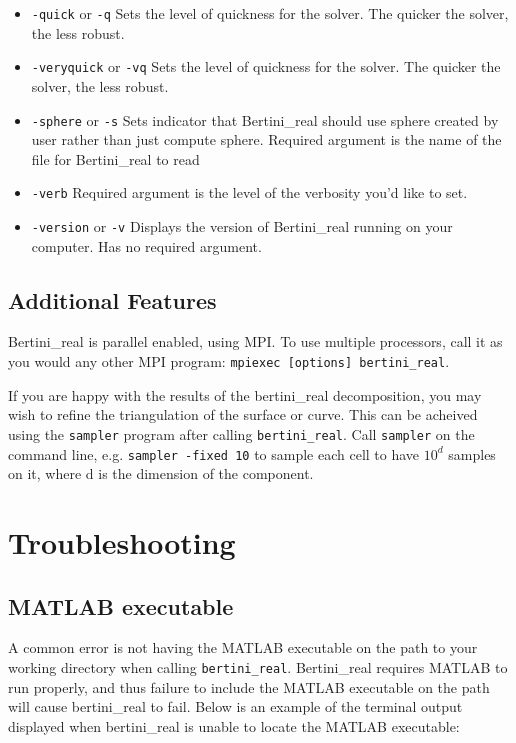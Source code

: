 \documentclass[10pt]{article}
\begin{document}
\begin {itemize}
\item \texttt{-quick} or \texttt{-q} \newline Sets the level of quickness for the solver. The quicker the solver, the less robust. 
\item \texttt{-veryquick} or \texttt{-vq} \newline Sets the level of quickness for the solver. The quicker the solver, the less robust. 
\item \texttt{-sphere} or \texttt{-s} \newline Sets indicator that Bertini\_real should use sphere created by user rather than just compute sphere. Required argument is the name of the file for Bertini\_real to read
\item \texttt{-verb} \newline Required argument is the level of the verbosity you'd like to set.
\item \texttt{-version} or \texttt{-v} \newline Displays the version of Bertini\_real running on your computer. Has no required argument. 
\end{itemize}

\subsection{Additional Features}

Bertini\_real is parallel enabled, using MPI. To use multiple processors, call it as you would any other MPI program: \texttt{mpiexec [options] bertini\_real}. \par
If you are happy with the results of the bertini\_real decomposition, you may wish to refine the triangulation of the surface or curve. This can be acheived using the \texttt{sampler} program after calling \texttt{bertini\_real}. Call \texttt{sampler} on the command line, e.g. \texttt{sampler -fixed 10} to sample each cell to have $10^d$ samples on it, where d is the dimension of the component. 

\section{Troubleshooting}
\subsection{MATLAB executable}
A common error is not having the MATLAB executable on the path to your working directory when calling \texttt{bertini\_real}. Bertini\_real requires MATLAB to run properly, and thus failure to include the MATLAB executable on the path will cause bertini\_real to fail. Below is an example of the terminal output displayed when bertini\_real is unable to locate the MATLAB executable: 
\end{document}
